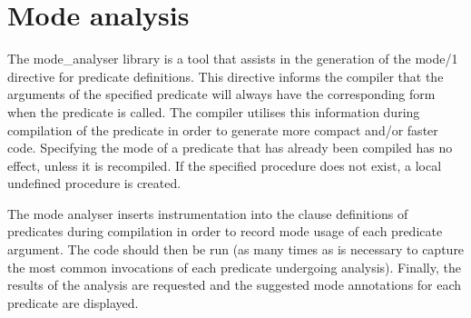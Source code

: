 \section{Mode analysis}
The mode_analyser library is a tool that assists in the generation 
of the mode/1 directive for predicate definitions. This directive informs 
the compiler that the arguments of the specified predicate will always 
have the corresponding form when the predicate is called. The compiler 
utilises this information during compilation of the predicate in order 
to generate more compact and/or faster code. Specifying the mode of a 
predicate that has already been compiled has no effect, unless it is 
recompiled. If the specified procedure does not exist, a local undefined 
procedure is created.

The mode analyser inserts instrumentation into the clause definitions 
of predicates during compilation in order to record mode usage of each 
predicate argument. The code should then be run (as many times as is 
necessary to capture the most common invocations of each predicate 
undergoing analysis). Finally, the results of the analysis are requested
and the suggested mode annotations for each predicate are displayed.


